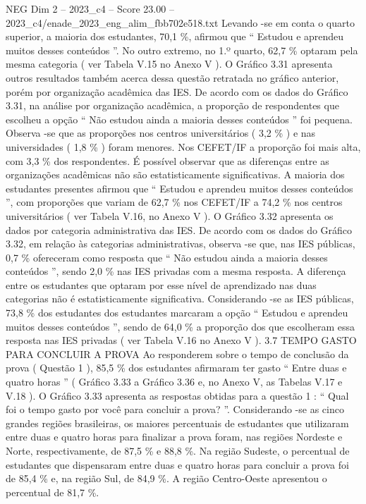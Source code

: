 \begin{textsample}{NEG Dim 2 – 2023\_c4 – Score 23.00 – 2023\_c4/enade\_2023\_eng\_alim\_fbb702e518.txt}
Levando -se em conta o quarto superior, a maioria dos estudantes, 70,1 \%, afirmou que “ Estudou e aprendeu muitos desses conteúdos ”.
No outro extremo, no 1.º quarto, 62,7 \% optaram pela mesma categoria ( ver Tabela V.15 no Anexo V ).
O Gráfico 3.31 apresenta outros resultados também acerca dessa questão retratada no gráfico anterior, porém por organização acadêmica das IES.
De acordo com os dados do Gráfico 3.31, na análise por organização acadêmica, a proporção de respondentes que escolheu a opção “ Não estudou ainda a maioria desses conteúdos ” foi pequena.
Observa -se que as proporções nos centros universitários ( 3,2 \% ) e nas universidades ( 1,8 \% ) foram menores.
Nos CEFET/IF a proporção foi mais alta, com 3,3 \% dos respondentes.
É possível observar que as diferenças entre as organizações acadêmicas não são estatisticamente significativas.
A maioria dos estudantes presentes afirmou que “ Estudou e aprendeu muitos desses conteúdos ”, com proporções que variam de 62,7 \% nos CEFET/IF a 74,2 \% nos centros universitários ( ver Tabela V.16, no Anexo V ).
O Gráfico 3.32 apresenta os dados por categoria administrativa das IES.
De acordo com os dados do Gráfico 3.32, em relação às categorias administrativas, observa -se que, nas IES públicas, 0,7 \% ofereceram como resposta que “ Não estudou ainda a maioria desses conteúdos ”, sendo 2,0 \% nas IES privadas com a mesma resposta.
A diferença entre os estudantes que optaram por esse nível de aprendizado nas duas categorias não é estatisticamente significativa.
Considerando -se as IES públicas, 73,8 \% dos estudantes dos estudantes marcaram a opção “ Estudou e aprendeu muitos desses conteúdos ”, sendo de 64,0 \% a proporção dos que escolheram essa resposta nas IES privadas ( ver Tabela V.16 no Anexo V ). 3.7 TEMPO GASTO PARA CONCLUIR A PROVA Ao responderem sobre o tempo de conclusão da prova ( Questão 1 ), 85,5 \% dos estudantes afirmaram ter gasto “ Entre duas e quatro horas ” ( Gráfico 3.33 a Gráfico 3.36 e, no Anexo V, as Tabelas V.17 e V.18 ).
O Gráfico 3.33 apresenta as respostas obtidas para a questão 1 : “ Qual foi o tempo gasto por você para concluir a prova? ”.
Considerando -se as cinco grandes regiões brasileiras, os maiores percentuais de estudantes que utilizaram entre duas e quatro horas para finalizar a prova foram, nas regiões Nordeste e Norte, respectivamente, de 87,5 \% e 88,8 \%.
Na região Sudeste, o percentual de estudantes que dispensaram entre duas e quatro horas para concluir a prova foi de 85,4 \% e, na região Sul, de 84,9 \%.
A região Centro-Oeste apresentou o percentual de 81,7 \%.

\end{textsample}
